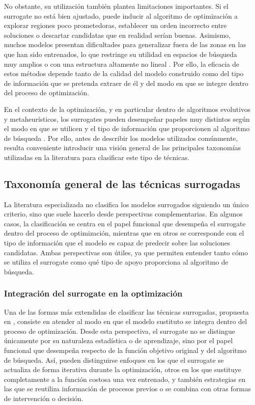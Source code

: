 No obstante, su utilización también plantea limitaciones importantes. Si el surrogate no está bien ajustado, puede inducir al algoritmo de optimización a explorar regiones poco prometedoras, establecer un orden incorrecto entre soluciones o descartar candidatas que en realidad serían buenas. Asimismo, muchos modelos presentan dificultades para generalizar fuera de las zonas en las que han sido entrenados, lo que restringe su utilidad en espacios de búsqueda muy amplios o con una estructura altamente no lineal \cite{forrester2009recent,bhosekar2018advances}. Por ello, la eficacia de estos métodos depende tanto de la calidad del modelo construido como del tipo de información que se pretenda extraer de él y del modo en que se integre dentro del proceso de optimización.

En el contexto de la optimización, y en particular dentro de algoritmos evolutivos y metaheurísticos, los surrogates pueden desempeñar papeles muy distintos según el modo en que se utilicen y el tipo de información que proporcionen al algoritmo de búsqueda \cite{jin2011surrogate,tong2021surrogate}. Por ello, antes de describir los modelos utilizados comúnmente, resulta conveniente introducir una visión general de las principales taxonomías utilizadas en la literatura para clasificar este tipo de técnicas.

\subsection{Taxonomía general de las técnicas surrogadas}

La literatura especializada no clasifica los modelos surrogados siguiendo un único criterio, sino que suele hacerlo desde perspectivas complementarias. En algunos casos, la clasificación se centra en el papel funcional que desempeña el surrogate dentro del proceso de optimización, mientras que en otros se corresponde con el tipo de información que el modelo es capaz de predecir sobre las soluciones candidatas. Ambas perspectivas son útiles, ya que permiten entender tanto cómo se utiliza el surrogate como qué tipo de apoyo proporciona al algoritmo de búsqueda.

\subsubsection{Integración del surrogate en la optimización}

Una de las formas más extendidas de clasificar las técnicas surrogadas, propuesta en \cite{bliek2022sustainableSBO}, consiste en atender al modo en que el modelo sustituto se integra dentro del proceso de optimización. Desde esta perspectiva, el surrogate no se distingue únicamente por su naturaleza estadística o de aprendizaje, sino por el papel funcional que desempeña respecto de la función objetivo original y del algoritmo de búsqueda. Así, pueden distinguirse enfoques en los que el surrogate se actualiza de forma iterativa durante la optimización, otros en los que sustituye completamente a la función costosa una vez entrenado, y también estrategias en las que se reutiliza información de procesos previos o se combina con otras formas de intervención o decisión.

